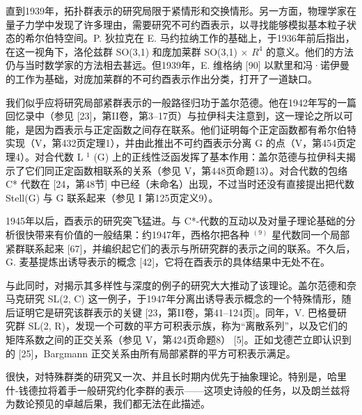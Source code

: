 
直到1939年，拓扑群表示的研究局限于紧情形和交换情形。另一方面，物理学家在量子力学中发现了许多理由，需要研究不可约酉表示，以寻找能够模拟基本粒子状态的希尔伯特空间。P. 狄拉克在 E. 马约拉纳工作的基础上，于1936年前后指出，在这一视角下，洛伦兹群 SO(3,1) 和庞加莱群 SO(3,1) × \(R^{4}\) 的意义。他们的方法仍与当时数学家的方法相去甚远。但1939年，E. 维格纳 {[}90{]} 以默里和冯·诺伊曼的工作为基础，对庞加莱群的不可约酉表示作出分类，打开了一道缺口。

我们似乎应将研究局部紧群表示的一般路径归功于盖尔范德。他在1942年写的一篇回忆录中（参见 {[}23{]}，第II卷，第3--17页）与拉伊科夫注意到，这一理论之所以可能，是因为酉表示与正定函数之间存在联系。他们证明每个正定函数都有希尔伯特实现（V，第432页定理1），并由此推出不可约酉表示分离 G 的点（V，第454页定理4）。对合代数 L \(^{1}\) (G) 上的正线性泛函发挥了基本作用：盖尔范德与拉伊科夫揭示了它们同正定函数相联系的关系（参见 V，第448页命题13）。对合代数的包络 C* 代数在 {[}24，第48节{]} 中已经（未命名）出现，不过当时还没有直接提出把代数 Stell(G) 与 G 联系起来（参见 I 第125页定义9）。

1945年以后，酉表示的研究突飞猛进。与 C*-代数的互动以及对量子理论基础的分析很快带来有价值的一般结果：约1947年，西格尔把各种 \(^{(9)}\) 星代数同一个局部紧群联系起来 {[}67{]}，并编织起它们的表示与所研究群的表示之间的联系。不久后，G. 麦基提炼出诱导表示的概念 {[}42{]}，它将在酉表示的具体结果中无处不在。

与此同时，对揭示其多样性与深度的例子的研究大大推动了该理论。盖尔范德和奈马克研究 SL(2, C) 这一例子，于1947年分离出诱导表示概念的一个特殊情形，随后证明它是研究该群表示的关键 {[}23，第II卷，第41--124页{]}。同年，V. 巴格曼研究群 SL(2, R)，发现一个可数的平方可积表示族，称为“离散系列”，以及它们的矩阵系数之间的正交关系（参见 V，第424页命题8） {[}5{]}。正如戈德芒立即认识到的 {[}25{]}，Bargmann 正交关系由所有局部紧群的平方可积表示满足。

很快，对特殊群类的研究又一次、并且长时期内优先于抽象理论。特别是，哈里什-钱德拉将着手一般研究约化李群的表示——这项史诗般的任务，以及朗兰兹将为数论预见的卓越后果，我们都无法在此描述。

